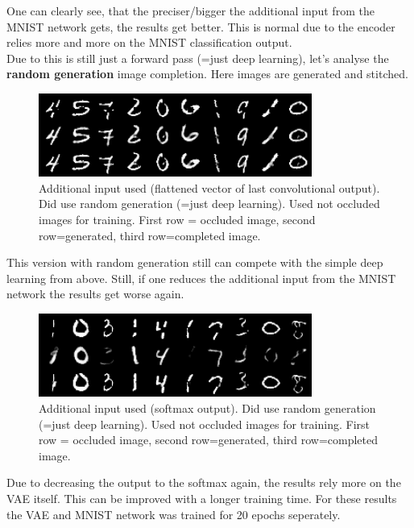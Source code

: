 \documentclass[
     11pt,         %
     a4paper,      %
     oneside,
     ]{article}
\begin{document}
One can clearly see, that the preciser/bigger the additional input from the MNIST network gets, the results get better. This is normal due to the encoder relies more and more on the MNIST classification output. \\
Due to this is still just a forward pass (=just deep learning), let's analyse the \textbf{random generation} image completion. Here images are generated and stitched.
\begin{figure}[H]
  \begin{center}
    \includegraphics[width=0.8\textwidth]{presentation_results/VAE/MNIST-VAE-useRandom_true-useMNIST_true-VAERepresentation_1-useOccludedForTrain_false.png}
    \caption{Additional input used (flattened vector of last convolutional output). Did use random generation (=just deep learning). Used not occluded images for training. First row = occluded image, second row=generated, third row=completed image.}
  \end{center}
\end{figure}
This version with random generation still can compete with the simple deep learning from above. Still, if one reduces the additional input from the MNIST network the results get worse again.
\begin{figure}[H]
  \begin{center}
    \includegraphics[width=0.8\textwidth]{presentation_results/VAE/MNIST-VAE-useRandom_true-useMNIST_true-VAERepresentation_3-useOccludedForTrain_false.png}
    \caption{Additional input used (softmax output). Did use random generation (=just deep learning). Used not occluded images for training. First row = occluded image, second row=generated, third row=completed image.}
  \end{center}
\end{figure}
Due to decreasing the output to the softmax again, the results rely more on the VAE itself. This can be improved with a longer training time. For these results the VAE and MNIST network was trained for 20 epochs seperately.\\
\end{document}
